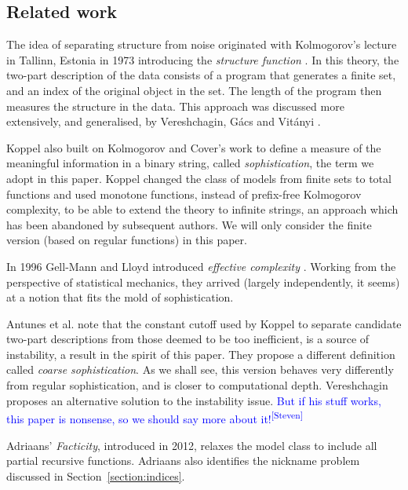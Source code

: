 \documentclass{style/llncs}
\newcommand{\sdr}[1]{\textcolor{blue}{\small #1\textsuperscript{[Steven]} }}
\begin{document}
\subsection{Related work}
The idea of separating structure from noise originated with Kolmogorov's lecture in Tallinn, Estonia in 1973 introducing the \emph{structure function} \cite{cover1985kolmogorov}. In this theory, the two-part description of the data consists of a program that generates a finite set, and an index of the original object in the set. The length of the program then measures the structure in the data. This approach was discussed more extensively, and generalised, by Vereshchagin, G\'acs and Vit\'anyi \cite{vereshchagin2004kolmogorov,gacs2001algorithmic}. 

Koppel \cite{koppelSoph1988,koppel1991almost} also built on Kolmogorov and Cover's work to define a measure of the meaningful information in a binary string, called \emph{sophistication}, the term we adopt in this paper. Koppel changed the class of models from finite sets to total functions and used monotone functions, instead of prefix-free Kolmogorov complexity, to be able to extend the theory to infinite strings, an approach which has been abandoned by subsequent authors. We will only consider the finite version (based on regular functions) in this paper.

In 1996 Gell-Mann and Lloyd introduced \emph{effective complexity} \cite{gellmann1996information}. Working from the perspective of statistical mechanics, they arrived (largely independently, it seems) at a notion that fits the mold of sophistication.

Antunes et al. \cite{antunes2009sophistication} note that the constant cutoff used by Koppel to separate candidate two-part descriptions from those deemed to be too inefficient, is a source of instability, a result in the spirit of this paper. They propose a different definition called \emph{coarse sophistication}. As we shall see, this version behaves very differently from regular sophistication, and is closer to computational depth. Vereshchagin \cite{vereshchagin2013algorithmic} proposes an alternative solution to the instability issue. \sdr{But if his stuff works, this paper is nonsense, so we should say more about it!}
 
Adriaans' \emph{Facticity}, introduced in 2012\cite{adriaans2012facticity}, relaxes the model class to include all partial recursive functions. Adriaans also identifies the nickname problem discussed in Section~\ref{section:indices}.
\end{document}

